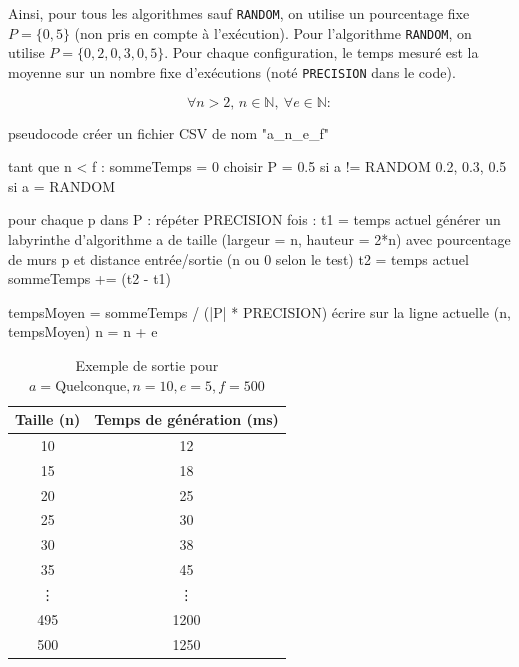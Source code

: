 \documentclass{butexFR}
\begin{document}

Ainsi, pour tous les algorithmes sauf \texttt{RANDOM}, on utilise un pourcentage fixe \(P = \{0{,}5\}\) (non pris en compte à l'exécution).  
Pour l’algorithme \texttt{RANDOM}, on utilise \(P = \{0{,}2, 0{,}3, 0{,}5\}\).  
Pour chaque configuration, le temps mesuré est la moyenne sur un nombre fixe d’exécutions (noté \texttt{PRECISION} dans le code).

\[
\forall n > 2, \, n \in \mathbb{N}, \ \forall e \in \mathbb{N} :
\]

\begin{codeboxlang}{pseudocode}
créer un fichier CSV de nom "a_n_e_f"

tant que n < f :
    sommeTemps = 0
    choisir P =
        {0.5} si a != RANDOM
        {0.2, 0.3, 0.5} si a = RANDOM

    pour chaque p dans P :
        répéter PRECISION fois :
            t1 = temps actuel
            générer un labyrinthe d'algorithme a
                de taille (largeur = n, hauteur = 2*n)
                avec pourcentage de murs p
                et distance entrée/sortie (n ou 0 selon le test)
            t2 = temps actuel
            sommeTemps += (t2 - t1)

    tempsMoyen = sommeTemps / (|P| * PRECISION)
    écrire sur la ligne actuelle (n, tempsMoyen)
    n = n + e
\end{codeboxlang}



\begin{table}[H]
\centering
\begin{tabular}{|c|c|}
\hline
\textbf{Taille (n)} & \textbf{Temps de génération (ms)} \\
\hline
10  & 12   \\
15  & 18   \\
20  & 25   \\
25  & 30   \\
30  & 38   \\
35  & 45   \\
\vdots & \vdots \\
495 & 1200 \\
500 & 1250 \\
\hline
\end{tabular}
\caption{Exemple de sortie pour $a = \text{Quelconque}, n = 10, e = 5, f = 500$}
\label{tab:output_example}
\end{table}
\end{document}
